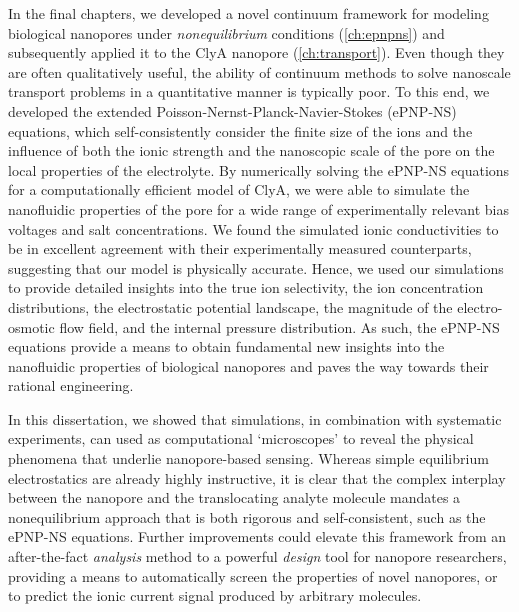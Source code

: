 In the final chapters, we developed a novel continuum framework for modeling biological nanopores under
\emph{nonequilibrium} conditions (\cref{ch:epnpns}) and subsequently applied it to the ClyA nanopore
(\cref{ch:transport}). Even though they are often qualitatively useful, the ability of continuum methods to
solve nanoscale transport problems in a quantitative manner is typically poor. To this end, we developed the
extended Poisson-Nernst-Planck-Navier-Stokes ({ePNP-NS}) equations, which self-consistently consider the
finite size of the ions and the influence of both the ionic strength and the nanoscopic scale of the pore on
the local properties of the electrolyte. By numerically solving the {ePNP-N}S equations for a computationally
efficient model of ClyA, we were able to simulate the nanofluidic properties of the pore for a wide range of
experimentally relevant bias voltages and salt concentrations. We found the simulated ionic conductivities to
be in excellent agreement with their experimentally measured counterparts, suggesting that our model is
physically accurate. Hence, we used our simulations to provide detailed insights into the true ion
selectivity, the ion concentration distributions, the electrostatic potential landscape, the magnitude of the
electro-osmotic flow field, and the internal pressure distribution. As such, the {ePNP-NS} equations provide a
means to obtain fundamental new insights into the nanofluidic properties of biological nanopores and paves the
way towards their rational engineering.

In this dissertation, we showed that simulations, in combination with systematic experiments, can used as
computational `microscopes' to reveal the physical phenomena that underlie nanopore-based sensing. Whereas
simple equilibrium electrostatics are already highly instructive, it is clear that the complex interplay
between the nanopore and the translocating analyte molecule mandates a nonequilibrium approach that is both
rigorous and self-consistent, such as the {ePNP-NS} equations. Further improvements could elevate this
framework from an after-the-fact \emph{analysis} method to a powerful \emph{design} tool for nanopore
researchers, providing a means to automatically screen the properties of novel nanopores, or to predict the
ionic current signal produced by arbitrary molecules.


\cleardoublepage

